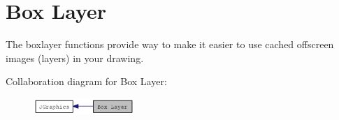 \hypertarget{group__boxlayer}{
\section{Box Layer}
\label{group__boxlayer}
}


The boxlayer functions provide way to make it easier to use cached offscreen images (layers) in your drawing.  


Collaboration diagram for Box Layer:\nopagebreak
\begin{figure}[H]
\begin{center}
\leavevmode
\includegraphics[width=108pt]{group__boxlayer}
\end{center}
\end{figure}
